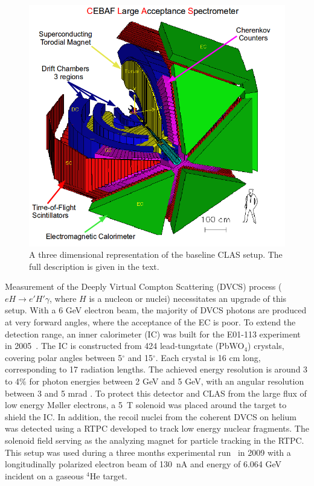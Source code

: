 \documentclass[preprint,5p]{elsarticle}
\begin{document}
\begin{figure}[tbp]
\centering \includegraphics[scale=0.3]{fig/test_clas.png}
\caption{A three dimensional representation of the baseline CLAS setup. The
   full description is given in the text.} \label{fig:CLAS}
\end{figure}

Measurement of the Deeply Virtual Compton Scattering (DVCS) process
($eH \rightarrow e' H' \gamma$, where $H$ is a nucleon or nuclei) necessitates an upgrade
of this setup.  With a 6 GeV electron beam, the majority of DVCS photons are produced
at very forward angles, where the acceptance of the EC is poor. To extend the detection range,
an inner calorimeter (IC) was built for the E01-113 experiment in 2005~\cite{FX}.
The IC is constructed from 424 lead-tungstate (PbWO$_{4}$) crystals, covering polar 
angles between 5$^{\circ}$ and 15$^{\circ}$. Each crystal is 16 cm long, corresponding
to 17 radiation lengths. The achieved energy resolution is around 3 to 4$\%$ for photon
energies between 2 GeV and 5 GeV, with an angular resolution between 3 and 5 mrad 
\cite{Hyon-suk}. To protect this detector and CLAS from the large flux of low energy M{\o}ller 
electrons, a 5~T solenoid was placed around the target to shield the IC. 
In addition, the recoil nuclei from the coherent DVCS on helium was detected 
using a RTPC developed to track low energy nuclear fragments. The solenoid field
serving as the analyzing magnet for particle tracking in the RTPC. This 
setup was used during a three months experimental run~\cite{proposal1,proposal2}
in 2009 with a longitudinally polarized electron beam of 130~nA 
and energy of 6.064 GeV incident on a gaseous $^{4}$He target.
\end{document}
